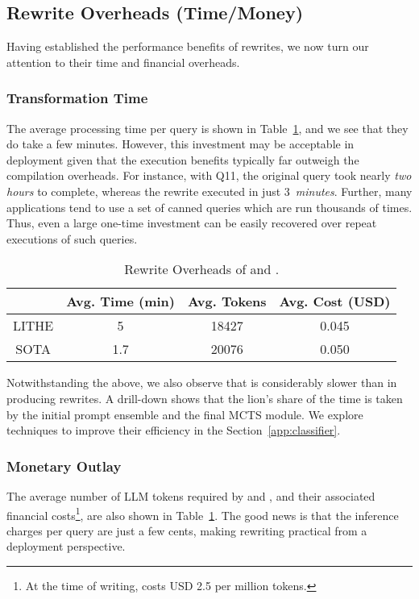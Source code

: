 \subsection{Rewrite Overheads (Time/Money)}
\label{sec:overheads}
Having established the performance benefits of rewrites, we now turn our attention to their time and financial overheads.
%

\subsubsection{Transformation Time}
The average processing time per \cpr query is shown in Table~\ref{tab:different_benchmark_cost}, and we see that they do take a few minutes. However, this investment may be acceptable in deployment given that the execution benefits typically far outweigh the compilation overheads. 
%
For instance, with Q11, the original query took nearly \emph{two hours} to complete, whereas the \lithe rewrite executed in just 3~\emph{minutes}.
Further, many applications tend to use a set of canned queries which are run thousands of times. Thus, even a large one-time investment can be easily recovered over repeat executions of such queries. 

\begin{table}[h]
\footnotesize
\centering
\caption{Rewrite Overheads of \lithe and \sota.}
\label{tab:different_benchmark_cost}
\begin{tabular}{|c|c|c|c|}
\hline
& \textbf{Avg. Time (min)} & \textbf{Avg. Tokens } & \textbf{Avg. Cost (USD) } \\ \hline \hline
LITHE       & 5  & 18427 & 0.045  \\ \hline
SOTA        & 1.7 & 20076 & 0.050 \\ \hline
\end{tabular}
\end{table}

Notwithstanding the above, we also observe that \lithe is considerably slower than \sota in producing rewrites. A drill-down 
shows that the lion's share of the time is taken by the initial prompt ensemble and the final MCTS module. We explore techniques to improve their efficiency in the Section~\ref{app:classifier}. 

\subsubsection{Monetary Outlay}
The average number of LLM tokens required by \lithe and \sota, and their associated financial costs\footnote{At the time of writing, \gpt costs USD 2.5 per million tokens.}, are also shown in Table~\ref{tab:different_benchmark_cost}. The good news is that the inference charges per query are just a few cents, making rewriting practical from a deployment perspective.
%

